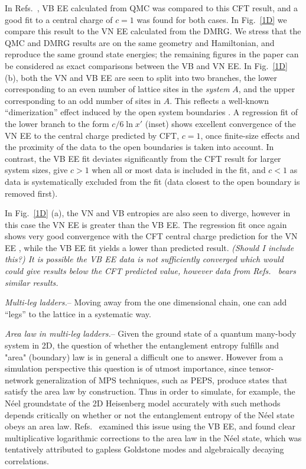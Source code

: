 \documentclass[prl,aps,twocolumn,floatfix,amsmath,amssymb,superscriptaddress,tightenlines]{revtex4}
\begin{document}
In Refs.~\cite{Alet, Chh}, VB EE calculated from QMC was compared to this CFT result, and a good fit to a central charge of $c=1$ was found for both cases.  In Fig.~\ref{1D} we compare this result to the VN EE calculated from the DMRG.  We stress that the QMC and DMRG results are on the same geometry and Hamiltonian, and reproduce the same ground state energies; the remaining figures in the paper can be considered as exact comparisons between the VB and VN EE.  In Fig.~\ref{1D} (b), both the VN and VB EE are seen to split into two branches, the lower corresponding to an even number of lattice sites in the {\it system} $A$, and the upper corresponding to an odd number of sites in $A$.  This reflects a well-known ``dimerization'' effect induced by the open system boundaries \cite{Ian1}.  A regression fit of the lower branch to the form $c/6 \ln {x'}$ (inset) shows excellent convergence of the VN EE to the central charge predicted by CFT, $c=1$, once finite-size effects and the proximity of the data to the open boundaries is taken into account.  In contrast, the VB EE fit deviates significantly from the CFT result for larger system sizes, give $c>1$ when all or most data is included in the fit, and $c<1$ as data is systematically excluded from the fit (data closest to the open boundary is removed first).

In Fig.~\ref{1D} (a), the VN and VB entropies are also seen to diverge, however in this case the VN EE is greater than the VB EE.  The regression fit once again shows very good convergence with the CFT central charge prediction for the VN EE , while the VB EE fit yields a lower than predicted result. {\it (Should I include this?) It is possible the VB EE data is not sufficiently converged which would could give results below the CFT predicted value, however data from Refs.~\cite{Alet,Chh} bears similar results. }

{\it Multi-leg ladders.}-- Moving away from the one dimensional chain, one can add ``legs'' to the lattice in a systematic way.

{\it Area law in multi-leg ladders.}--  Given the ground state of a quantum many-body system in 2D, the question of whether the entanglement entropy fulfills and "area" (boundary) law is in general a difficult one to answer.  
However from a simulation perspective this question is of utmost importance, since tensor-network generalization of MPS techniques, such as PEPS, produce states that satisfy the area law by construction.  Thus in order to simulate, for example, the N\'eel groundstate of the 2D Heisenberg model accurately with such methods depends critically on whether or not the entanglement entropy of the N\'eel state obeys an area law.  Refs.~\cite{Alet,Chh} examined this issue using the VB EE, and found clear multiplicative logarithmic corrections to the area law in the N\'eel state, which was tentatively attributed to gapless Goldstone modes and algebraically decaying correlations.  
\end{document}
